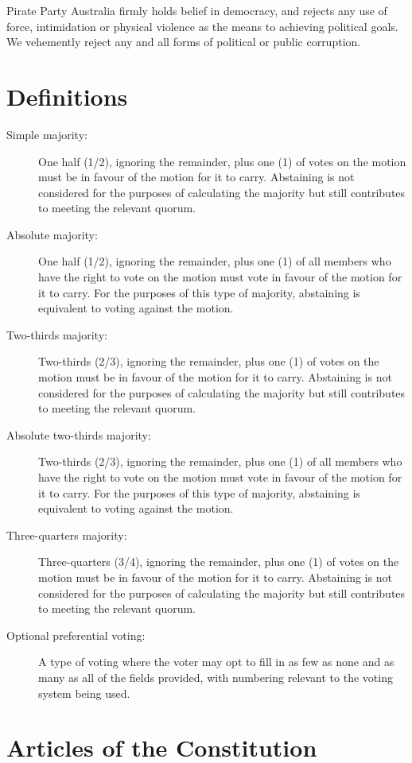 \documentclass[a4paper,titlepage,8.5pt]{article}
\begin{document}
Pirate Party Australia firmly holds belief in democracy, and rejects any use of force, intimidation or physical violence as the means to achieving political goals. We vehemently reject any and all forms of political or public corruption.
\newpage

\part{Definitions}

\begin{description}
\item[Simple majority:] One half (1/2), ignoring the remainder, plus one (1) of votes on the motion must be in favour of the motion for it to carry. Abstaining is not considered for the purposes of calculating the majority but still contributes to meeting the relevant quorum.
\item[Absolute majority:] One half (1/2), ignoring the remainder, plus one (1) of all members who have the right to vote on the motion must vote in favour of the motion for it to carry. For the purposes of this type of majority, abstaining is equivalent to voting against the motion.
\item[Two-thirds majority:] Two-thirds (2/3), ignoring the remainder, plus one (1) of votes on the motion must be in favour of the motion for it to carry. Abstaining is not considered for the purposes of calculating the majority but still contributes to meeting the relevant quorum.
\item[Absolute two-thirds majority:] Two-thirds (2/3), ignoring the remainder, plus one (1) of all members who have the right to vote on the motion must vote in favour of the motion for it to carry. For the purposes of this type of majority, abstaining is equivalent to voting against the motion.
\item[Three-quarters majority:] Three-quarters (3/4), ignoring the remainder, plus one (1) of votes on the motion must be in favour of the motion for it to carry. Abstaining is not considered for the purposes of calculating the majority but still contributes to meeting the relevant quorum.
\item[Optional preferential voting:] A type of voting where the voter may opt to fill in as few as none and as many as all of the fields provided, with numbering relevant to the voting system being used.
\end{description}

\part{Articles of the Constitution}
\end{document}
